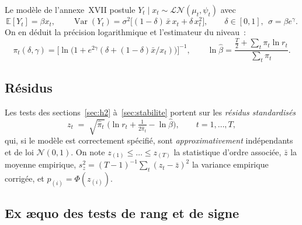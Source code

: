 \documentclass[a4paper,11pt]{article}
\begin{document}
Le modèle de l'annexe~XVII postule $Y_t \mid x_t \sim \mathcal{LN}(\mu_t,\psi_t)$ avec
\[
  \mathbb{E}[Y_t] = \beta x_t,
  \qquad
  \operatorname{Var}(Y_t) = \sigma^2\big[(1-\delta)\,\bar x\, x_t + \delta\, x_t^2\big],
  \qquad \delta\in[0,1],\ \ \sigma = \beta e^{\gamma}.
\]
On en déduit la précision logarithmique et l'estimateur du niveau~:
\[
  \pi_t(\delta,\gamma) = \Big[\ln\!\big(1 + e^{2\gamma}(\delta + (1-\delta)\bar x / x_t)\big)\Big]^{-1},
  \qquad
  \ln\hat\beta = \frac{\tfrac{T}{2} + \sum_t \pi_t \ln r_t}{\sum_t \pi_t}.
\]

\subsection*{Résidus}

Les tests des sections~\ref{sec:h2} à~\ref{sec:stabilite} portent sur les \emph{résidus standardisés}
\[
  z_t \;=\; \sqrt{\hat\pi_t}\;\Big(\ln r_t + \tfrac{1}{2\hat\pi_t} - \ln\hat\beta\Big),
  \qquad t = 1,\dots,T ,
\]
qui, si le modèle est correctement spécifié, sont \emph{approximativement} indépendants et de loi
$\mathcal{N}(0,1)$. On note $z_{(1)} \le \dots \le z_{(T)}$ la statistique d'ordre associée,
$\bar z$ la moyenne empirique, $s_z^2 = (T-1)^{-1}\sum_t (z_t - \bar z)^2$ la variance empirique
corrigée, et $p_{(i)} = \Phi(z_{(i)})$.

\subsection*{Ex \ae quo des tests de rang et de signe}
\label{sec:ex-aequo}
\end{document}
